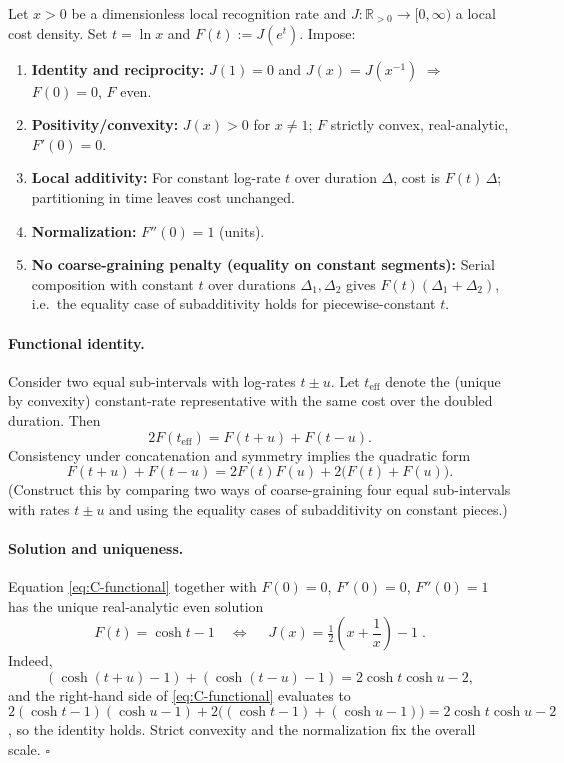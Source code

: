 \documentclass[11pt,letterpaper]{article}
\theoremstyle{definition}
\begin{document}
Let $x>0$ be a dimensionless local recognition rate and $J:\mathbb R_{>0}\to[0,\infty)$ a local cost density. Set $t=\ln x$ and $F(t):=J(e^t)$. Impose:

\begin{enumerate}
\item \textbf{Identity and reciprocity:} $J(1)=0$ and $J(x)=J(x^{-1})$ $\Rightarrow$ $F(0)=0$, $F$ even.
\item \textbf{Positivity/convexity:} $J(x)>0$ for $x\neq 1$; $F$ strictly convex, real-analytic, $F'(0)=0$.
\item \textbf{Local additivity:} For constant log-rate $t$ over duration $\Delta$, cost is $F(t)\,\Delta$; partitioning in time leaves cost unchanged.
\item \textbf{Normalization:} $F''(0)=1$ (units).
\item \textbf{No coarse-graining penalty (equality on constant segments):} Serial composition with constant $t$ over durations $\Delta_1,\Delta_2$ gives $F(t)(\Delta_1+\Delta_2)$, i.e.\ the equality case of subadditivity holds for piecewise-constant $t$.
\end{enumerate}

\paragraph{Functional identity.}
Consider two equal sub-intervals with log-rates $t\pm u$. Let $t_{\mathrm{eff}}$ denote the (unique by convexity) constant-rate representative with the same cost over the doubled duration. Then
\begin{equation}
2F(t_{\mathrm{eff}})=F(t+u)+F(t-u).
\end{equation}
Consistency under concatenation and symmetry implies the quadratic form
\begin{equation}
F(t+u)+F(t-u)=2F(t)F(u)+2\bigl(F(t)+F(u)\bigr).
\label{eq:C-functional}
\end{equation}
(Construct this by comparing two ways of coarse-graining four equal sub-intervals with rates $t\pm u$ and using the equality cases of subadditivity on constant pieces.)

\paragraph{Solution and uniqueness.}
Equation \eqref{eq:C-functional} together with $F(0)=0$, $F'(0)=0$, $F''(0)=1$ has the unique real-analytic even solution
\begin{equation}
F(t)=\cosh t - 1
\quad\Longleftrightarrow\quad
\boxed{\;J(x)=\tfrac12\!\left(x+\frac1x\right)-1\;}.
\end{equation}
Indeed,
\[
(\cosh(t+u)-1)+(\cosh(t-u)-1)=2\cosh t\cosh u -2,
\]
and the right-hand side of \eqref{eq:C-functional} evaluates to
$2(\cosh t-1)(\cosh u-1)+2\bigl((\cosh t-1)+(\cosh u-1)\bigr)=2\cosh t\cosh u-2$,
so the identity holds. Strict convexity and the normalization fix the overall scale. \hfill$\square$
\end{document}
